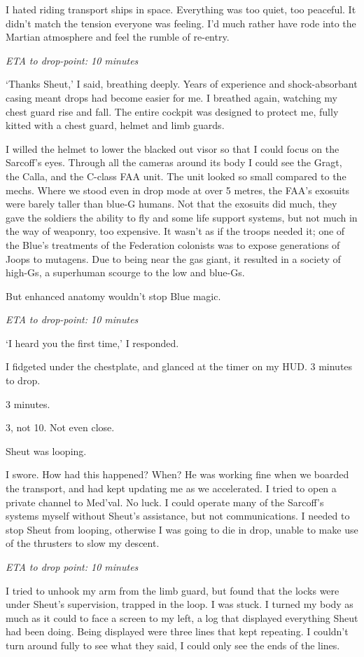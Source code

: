 I hated riding transport ships in space. Everything was too quiet, too peaceful. It didn't match the tension everyone was feeling. I'd much rather have rode into the Martian atmosphere and feel the rumble of re-entry.

{\it ETA to drop-point: 10 minutes}

`Thanks Sheut,' I said, breathing deeply. Years of experience and shock-absorbant casing meant drops had become easier for me. I breathed again, watching my chest guard rise and fall. The entire cockpit was designed to protect me, fully kitted with a chest guard, helmet and limb guards.

I willed the helmet to lower the blacked out visor so that I could focus on the Sarcoff's eyes. Through all the cameras around its body I could see the Gragt, the Calla, and the C-class FAA unit. The unit looked so small compared to the mechs. Where we stood even in drop mode at over 5 metres, the FAA's exosuits were barely taller than blue-G humans. Not that the exosuits did much, they gave the soldiers the ability to fly and some life support systems, but not much in the way of weaponry, too expensive. It wasn't as if the troops needed it; one of the Blue's treatments of the Federation colonists was to expose generations of Joops to mutagens. Due to being near the gas giant, it resulted in a society of high-Gs, a superhuman scourge to the low and blue-Gs.

But enhanced anatomy wouldn't stop Blue magic.

{\it ETA to drop-point: 10 minutes}

`I heard you the first time,' I responded.

I fidgeted under the chestplate, and glanced at the timer on my HUD. 3 minutes to drop.

3 minutes.

3, not 10. Not even close.

Sheut was looping.

I swore. How had this happened? When? He was working fine when we boarded the transport, and had kept updating me as we accelerated. I tried to open a private channel to Med'val. No luck. I could operate many of the Sarcoff's systems myself without Sheut's assistance, but not communications. I needed to stop Sheut from looping, otherwise I was going to die in drop, unable to make use of the thrusters to slow my descent.

{\it ETA to drop point: 10 minutes}

I tried to unhook my arm from the limb guard, but found that the locks were under Sheut's supervision, trapped in the loop. I was stuck. I turned my body as much as it could to face a screen to my left, a log that displayed everything Sheut had been doing. Being displayed were three lines that kept repeating. I couldn't turn around fully to see what they said, I could only see the ends of the lines.

